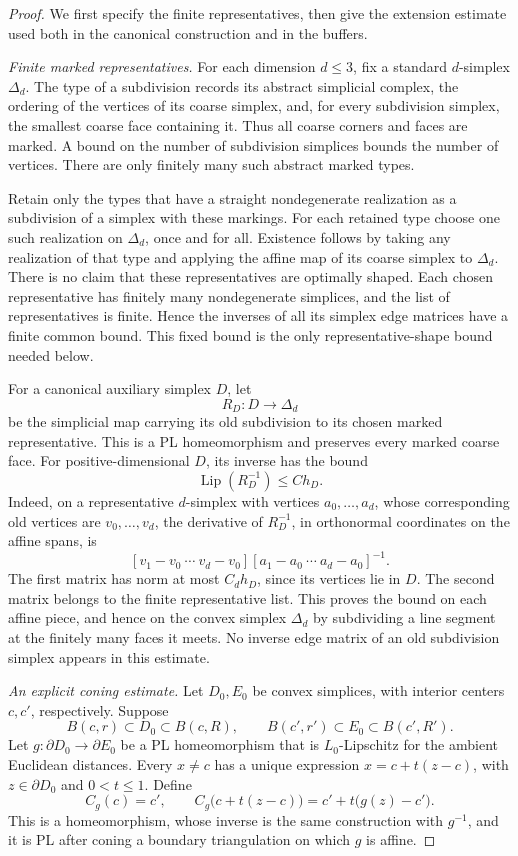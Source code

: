 \documentclass[11pt]{article}
\numberwithin{equation}{section}
\theoremstyle{definition}
\theoremstyle{remark}
\begin{document}
\begin{proof}
We first specify the finite representatives, then give the extension
estimate used both in the canonical construction and in the buffers.

\emph{Finite marked representatives.}
For each dimension $d\leq 3$, fix a standard $d$-simplex $\Delta_d$.
The type of a subdivision records its abstract simplicial complex,
the ordering of the vertices of its coarse simplex, and, for every
subdivision simplex, the smallest coarse face containing it.
Thus all coarse corners and faces are marked.  A bound on the number
of subdivision simplices bounds the number of vertices.  There are
only finitely many such abstract marked types.

Retain only the types that have a straight nondegenerate realization
as a subdivision of a simplex with these markings.  For each retained
type choose one such realization on $\Delta_d$, once and for all.
Existence follows by taking any realization of that type and applying
the affine map of its coarse simplex to $\Delta_d$.  There is no
claim that these representatives are optimally shaped.  Each chosen
representative has finitely many nondegenerate simplices, and the
list of representatives is finite.  Hence the inverses of all its
simplex edge matrices have a finite common bound.  This fixed bound
is the only representative-shape bound needed below.

For a canonical auxiliary simplex $D$, let
\[
 R_D:D\longrightarrow\Delta_d
\]
be the simplicial map carrying its old subdivision to its chosen
marked representative.  This is a PL homeomorphism and preserves
every marked coarse face.  For positive-dimensional $D$, its inverse has the bound
\[
 \operatorname{Lip}(R_D^{-1})\leq C h_D.
\]
Indeed, on a representative $d$-simplex with vertices
$a_0,\ldots,a_d$, whose corresponding old vertices are
$v_0,\ldots,v_d$, the derivative of $R_D^{-1}$, in orthonormal
coordinates on the affine spans, is
\[
 [v_1-v_0\ \cdots\ v_d-v_0]
 [a_1-a_0\ \cdots\ a_d-a_0]^{-1}.
\]
The first matrix has norm at most $C_d h_D$, since its vertices lie
in $D$.  The second matrix belongs to the finite representative
list.  This proves the bound on each affine piece, and hence on
the convex simplex $\Delta_d$ by subdividing a line segment at the
finitely many faces it meets.  No inverse edge matrix of an old
subdivision simplex appears in this estimate.

\emph{An explicit coning estimate.}
Let $D_0,E_0$ be convex simplices, with interior centers $c,c'$,
respectively.  Suppose
\[
 B(c,r)\subset D_0\subset B(c,R),\qquad
 B(c',r')\subset E_0\subset B(c',R').
\]
Let $g:\partial D_0\to\partial E_0$ be a PL homeomorphism that is
$L_0$-Lipschitz for the ambient Euclidean distances.  Every
$x\ne c$ has a unique expression
$x=c+t(z-c)$, with $z\in\partial D_0$ and $0<t\leq 1$.
Define
\[
 C_g(c)=c',\qquad
 C_g\bigl(c+t(z-c)\bigr)=c'+t\bigl(g(z)-c'\bigr).
\]
This is a homeomorphism, whose inverse is the same construction
with $g^{-1}$, and it is PL after coning a boundary triangulation
on which $g$ is affine.


\end{proof}
\end{document}
